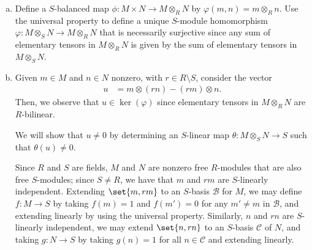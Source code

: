 \documentclass[10pt]{mypackage}
\begin{document}
\begin{solution}\hfill
  \begin{enumerate}[(a)]
    \item Define a $S$-balanced map $\phi\colon M\times N\rightarrow M\otimes_{R}N$ by $\varphi\left( m,n \right) = m\otimes_{R}n$. Use the universal property to define a unique $S$-module homomorphism $\varphi\colon M\otimes_{S}N\rightarrow M\otimes_{R}N$ that is necessarily surjective since any sum of elementary tensors in $M\otimes_{R}N$ is given by the sum of elementary tensors in $M\otimes_{S}N$.
    \item Given $m\in M$ and $n\in N$ nonzero, with $r\in R\setminus S$, consider the vector
      \begin{align*}
        u &= m\otimes \left( rn \right) - \left( rm \right)\otimes n.
      \end{align*}
      Then, we observe that $u\in \ker\left( \varphi \right)$ since elementary tensors in $M\otimes_{R}N$ are $R$-bilinear.

      We will show that $u\neq 0$ by determining an $S$-linear map $\theta\colon M\otimes_{S}N\rightarrow S$ such that $\theta\left( u \right)\neq 0$.

      Since $R$ and $S$ are fields, $M$ and $N$ are nonzero free $R$-modules that are also free $S$-modules; since $S\neq R$, we have that $m$ and $rm$ are $S$-linearly independent. Extending $\set{m,rm}$ to an $S$-basis $ \mathcal{B} $ for $M$, we may define $f\colon M\rightarrow S$ by taking $f(m) = 1$ and $f(m') = 0$ for any $m'\neq m$ in $ \mathcal{B} $, and extending linearly by using the universal property. Similarly, $n$ and $rn$ are $S$-linearly independent, we may extend $\set{n,rn}$ to an $S$-basis $ \mathcal{C} $ of $N$, and taking $g\colon N\rightarrow S$ by taking $g(n) = 1$ for all $n\in \mathcal{C}$ and extending linearly.


\end{enumerate}
\end{solution}
\end{document}
